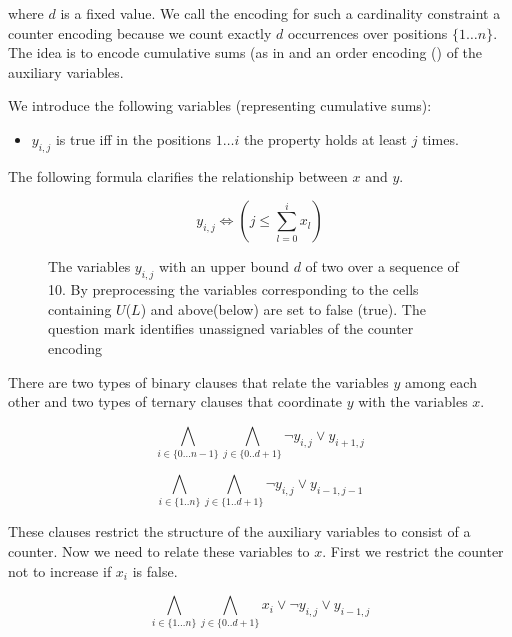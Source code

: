 \documentclass[]{llncs}
\begin{document}
where $d$ is a fixed value.  We call the encoding for such a cardinality
constraint a counter encoding because we count exactly $d$ occurrences
over positions $\{1\ldots n\}$. The idea is to encode cumulative sums
(as in \cite{Brand07} and an order encoding (\cite{Tamura09}) of
the auxiliary variables. 

We introduce the following variables (representing cumulative sums): 

\begin{itemize}
    \item $y_{i,j}$ is true iff in the positions $1 \ldots i$ the
        property holds at least $j$ times.        
\end{itemize}

The following formula clarifies the relationship between $x$ and $y$.

$$ y_{i,j} \iff (j \leq \sum_{l=0}^{i} x_{l}) $$


\begin{figure}
\centering 
\caption{The variables $y_{i,j}$ with an upper bound $d$ of two over a
    sequence of 10. By preprocessing the variables corresponding to the
    cells containing $U$($L$) and above(below) are set to false (true).
    The question mark identifies unassigned variables of the counter
    encoding}
%
\end{figure}

There are two types of binary clauses that relate the variables $y$ among
each other and two types of ternary clauses that coordinate $y$ with the
variables $x$.

\begin{equation}
    \bigwedge_{i \in \{0\ldots n-1\}} \bigwedge_{j \in\{0..d+1\}}
    \neg y_{i,j} \vee y_{i+1,j}
\end{equation}

\begin{equation}
    \bigwedge_{i \in \{1..n\}} \bigwedge_{j\in \{1..d+1\}}
    \neg y_{i,j} \vee y_{i-1,j-1}
\end{equation}

These clauses restrict the structure of the auxiliary variables to
consist of a counter. Now we need to relate these variables to $x$. 
First we restrict the counter not to increase if $x_{i}$ is
false. 


\begin{equation}
    \bigwedge_{i \in \{1\ldots n\}} \bigwedge_{j\in\{0..d+1\}}
    x_{i} \vee \neg y_{i,j} \vee y_{i-1,j}
\end{equation}
\end{document}
